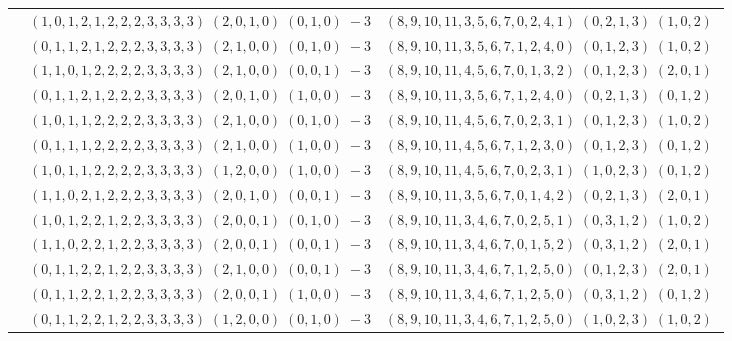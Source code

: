 \documentclass[11pt]{article}
\begin{document}
\begin{longtable}[l]{|c|c|c|}
 \cline{2-3} 
 & $(1 ,0 ,1 ,2 ,1 ,2 ,2 ,2 ,3 ,3 ,3 ,3) \;(2 ,0 ,1 ,0) \;(0 ,1 ,0) \;-3$ & $(8 ,9 ,10 ,11 ,3 ,5 ,6 ,7 ,0 ,2 ,4 ,1) \;(0 ,2 ,1 ,3) \;(1 ,0 ,2) \;$\\ 
 \cline{2-3} 
 & $(0 ,1 ,1 ,2 ,1 ,2 ,2 ,2 ,3 ,3 ,3 ,3) \;(2 ,1 ,0 ,0) \;(0 ,1 ,0) \;-3$ & $(8 ,9 ,10 ,11 ,3 ,5 ,6 ,7 ,1 ,2 ,4 ,0) \;(0 ,1 ,2 ,3) \;(1 ,0 ,2) \;$\\ 
 \cline{2-3} 
 & $(1 ,1 ,0 ,1 ,2 ,2 ,2 ,2 ,3 ,3 ,3 ,3) \;(2 ,1 ,0 ,0) \;(0 ,0 ,1) \;-3$ & $(8 ,9 ,10 ,11 ,4 ,5 ,6 ,7 ,0 ,1 ,3 ,2) \;(0 ,1 ,2 ,3) \;(2 ,0 ,1) \;$\\ 
 \cline{2-3} 
 & $(0 ,1 ,1 ,2 ,1 ,2 ,2 ,2 ,3 ,3 ,3 ,3) \;(2 ,0 ,1 ,0) \;(1 ,0 ,0) \;-3$ & $(8 ,9 ,10 ,11 ,3 ,5 ,6 ,7 ,1 ,2 ,4 ,0) \;(0 ,2 ,1 ,3) \;(0 ,1 ,2) \;$\\ 
 \cline{2-3} 
 & $(1 ,0 ,1 ,1 ,2 ,2 ,2 ,2 ,3 ,3 ,3 ,3) \;(2 ,1 ,0 ,0) \;(0 ,1 ,0) \;-3$ & $(8 ,9 ,10 ,11 ,4 ,5 ,6 ,7 ,0 ,2 ,3 ,1) \;(0 ,1 ,2 ,3) \;(1 ,0 ,2) \;$\\ 
 \cline{2-3} 
 & $(0 ,1 ,1 ,1 ,2 ,2 ,2 ,2 ,3 ,3 ,3 ,3) \;(2 ,1 ,0 ,0) \;(1 ,0 ,0) \;-3$ & $(8 ,9 ,10 ,11 ,4 ,5 ,6 ,7 ,1 ,2 ,3 ,0) \;(0 ,1 ,2 ,3) \;(0 ,1 ,2) \;$\\ 
 \cline{2-3} 
 & $(1 ,0 ,1 ,1 ,2 ,2 ,2 ,2 ,3 ,3 ,3 ,3) \;(1 ,2 ,0 ,0) \;(1 ,0 ,0) \;-3$ & $(8 ,9 ,10 ,11 ,4 ,5 ,6 ,7 ,0 ,2 ,3 ,1) \;(1 ,0 ,2 ,3) \;(0 ,1 ,2) \;$\\ 
 \cline{2-3} 
 & $(1 ,1 ,0 ,2 ,1 ,2 ,2 ,2 ,3 ,3 ,3 ,3) \;(2 ,0 ,1 ,0) \;(0 ,0 ,1) \;-3$ & $(8 ,9 ,10 ,11 ,3 ,5 ,6 ,7 ,0 ,1 ,4 ,2) \;(0 ,2 ,1 ,3) \;(2 ,0 ,1) \;$\\ 
 \cline{2-3} 
 & $(1 ,0 ,1 ,2 ,2 ,1 ,2 ,2 ,3 ,3 ,3 ,3) \;(2 ,0 ,0 ,1) \;(0 ,1 ,0) \;-3$ & $(8 ,9 ,10 ,11 ,3 ,4 ,6 ,7 ,0 ,2 ,5 ,1) \;(0 ,3 ,1 ,2) \;(1 ,0 ,2) \;$\\ 
 \cline{2-3} 
 & $(1 ,1 ,0 ,2 ,2 ,1 ,2 ,2 ,3 ,3 ,3 ,3) \;(2 ,0 ,0 ,1) \;(0 ,0 ,1) \;-3$ & $(8 ,9 ,10 ,11 ,3 ,4 ,6 ,7 ,0 ,1 ,5 ,2) \;(0 ,3 ,1 ,2) \;(2 ,0 ,1) \;$\\ 
 \cline{2-3} 
 & $(0 ,1 ,1 ,2 ,2 ,1 ,2 ,2 ,3 ,3 ,3 ,3) \;(2 ,1 ,0 ,0) \;(0 ,0 ,1) \;-3$ & $(8 ,9 ,10 ,11 ,3 ,4 ,6 ,7 ,1 ,2 ,5 ,0) \;(0 ,1 ,2 ,3) \;(2 ,0 ,1) \;$\\ 
 \cline{2-3} 
 & $(0 ,1 ,1 ,2 ,2 ,1 ,2 ,2 ,3 ,3 ,3 ,3) \;(2 ,0 ,0 ,1) \;(1 ,0 ,0) \;-3$ & $(8 ,9 ,10 ,11 ,3 ,4 ,6 ,7 ,1 ,2 ,5 ,0) \;(0 ,3 ,1 ,2) \;(0 ,1 ,2) \;$\\ 
 \cline{2-3} 
 & $(0 ,1 ,1 ,2 ,2 ,1 ,2 ,2 ,3 ,3 ,3 ,3) \;(1 ,2 ,0 ,0) \;(0 ,1 ,0) \;-3$ & $(8 ,9 ,10 ,11 ,3 ,4 ,6 ,7 ,1 ,2 ,5 ,0) \;(1 ,0 ,2 ,3) \;(1 ,0 ,2) \;$\\ 

\end{longtable}
\end{document}
